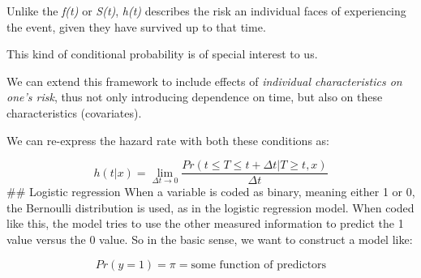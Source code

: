 \documentclass[
  letterpaper,
  DIV=11,
  numbers=noendperiod]{scrreprt}
\begin{document}
Unlike the \emph{f(t)} or \emph{S(t)}, \emph{h(t)} describes the risk an
individual faces of experiencing the event, given they have survived up
to that time.

This kind of conditional probability is of special interest to us.

We can extend this framework to include effects of \emph{individual
characteristics on one's risk}, thus not only introducing dependence on
time, but also on these characteristics (covariates).

We can re-express the hazard rate with both these conditions as:

\[h(t|x) = \lim_{\Delta t \rightarrow 0} \frac{Pr(t \leqslant T \leqslant t + \Delta t | T \geqslant t, x)}{\Delta t}\]
\#\# Logistic regression When a variable is coded as binary, meaning
either 1 or 0, the Bernoulli distribution is used, as in the logistic
regression model. When coded like this, the model tries to use the other
measured information to predict the 1 value versus the 0 value. So in
the basic sense, we want to construct a model like:

\[Pr(y=1) =\pi =  \text{some function of predictors}\]
\end{document}
